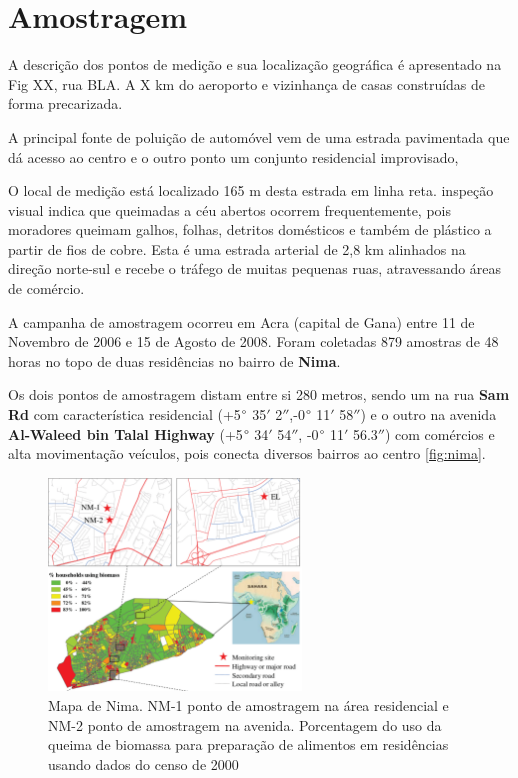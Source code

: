 \section{Amostragem}


A descrição dos pontos de medição e sua localização geográfica é apresentado 
na Fig XX, rua BLA. 
A X km do aeroporto e vizinhança de casas construídas de forma precarizada.

A principal fonte de poluição de automóvel vem de uma estrada pavimentada que 
dá acesso ao centro e o outro ponto um conjunto residencial improvisado, 

O local de medição está localizado 165 m desta estrada em linha reta. 
inspeção visual indica que queimadas a céu abertos ocorrem frequentemente, 
pois moradores queimam galhos, folhas, detritos domésticos e também de plástico 
a partir de fios de cobre. 
Esta é uma estrada arterial de 2,8 km alinhados na direção norte-sul e recebe o 
tráfego de muitas pequenas ruas, atravessando áreas de comércio. 

A campanha de amostragem ocorreu em Acra (capital de Gana) 
entre 11 de Novembro de 2006 e 15 de Agosto de 2008. 
Foram coletadas 879 amostras de 48 horas no topo de duas residências 
no bairro de \textbf{Nima}.

Os dois pontos de amostragem distam entre si 280 metros, sendo um na rua
\textbf{Sam Rd} com característica residencial
(+5$\degree$ 35$'$ 2$''$,-0$\degree$ 11$'$ 58$''$)
e o outro na avenida \textbf{Al-Waleed bin Talal Highway} 
(+5$\degree$ 34$'$ 54$''$, -0$\degree$ 11$'$ 56.3$''$) com comércios e
alta movimentação veículos, pois conecta diversos bairros ao centro
\ref{fig:nima}. 

\begin{figure}[H]
\begin{center}
  \includegraphics[width=0.6\textwidth]{../inputs/images/zheng/nima_mapa.pdf}
  \caption{Mapa de Nima. NM-1 ponto de amostragem na área residencial e 
           NM-2 ponto de amostragem na avenida. Porcentagem do uso da queima
           de biomassa para preparação de alimentos em residências usando dados
           do censo de 2000 \citep{ghanacensus2003} \label{fig:nima_mapa}}
\end{center}
\end{figure}

